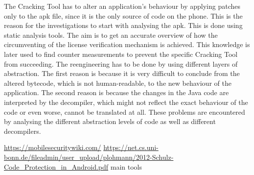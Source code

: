 The Cracking Tool has to alter an application's behaviour by applying patches only to the \gls{apk} file, since it is the only source of code on the phone. This is the reason for the investigations to start with analysing the \gls{apk}. This is done using static analysis tools. The aim is to get an accurate overview of how the circumventing of the license verification mechanism is achieved. This knowledge is later used to find counter measurements to prevent the specific Cracking Tool from succeeding.\newline
The reengineering has to be done by using different layers of abstraction. The first reason is because it is very difficult to conclude from the altered bytecode, which is not human-readable, to the new behaviour of the application. The second reason is because the changes in the Java code are interpreted by the decompiler, which might not reflect the exact behaviour of the code or even worse, cannot be translated at all.\newline
These problems are encountered by analysing the different abstraction levels of code as well as different decompilers.

\url{https://mobilesecuritywiki.com/}\newline
\url{https://net.cs.uni-bonn.de/fileadmin/user_upload/plohmann/2012-Schulz-Code_Protection_in_Android.pdf}\newline
main tools\newline
